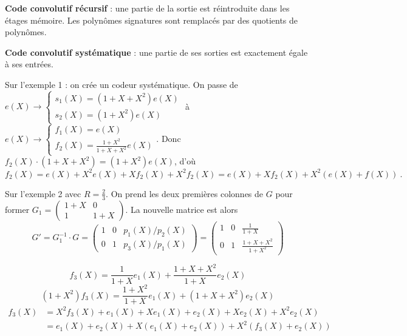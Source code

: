 	\begin{defn}
		\textbf{Code convolutif récursif} : une partie de la sortie est réintroduite dans les étages mémoire.
		Les polynômes signatures sont remplacés par des quotients de polynômes.
	\end{defn}
	
	\begin{defn}
		\textbf{Code convolutif systématique} : une partie de ses sorties est exactement égale à ses entrées.
	\end{defn}

	\begin{ex}
		Sur l'exemple 1 : on crée un codeur systématique.
		On passe de $e(X) \to \left\{ \begin{array}{l}
			s_1(X) = (1 + X + X^2) e(X) \\
			s_2(X) = (1 + X^2) e(X)
			\end{array} \right.$
		à $e(X) \to \left\{ \begin{array}{l}
			f_1(X) = e(X) \\
			f_2(X) = \frac{1 + X^2}{1 + X + X^2} e(X)
			\end{array} \right.$.
		Donc $f_2(X) \cdot (1 + X + X^2) = (1 + X^2) e(X)$, d'où
		$$f_2(X) = e(X) + X^2 e(X) + X f_2(X) + X^2 f_2(X) = e(X) + X f_2(X) + X^2 (e(X) + f(X))\ .$$
		
	\end{ex}
	
	\begin{ex}
		Sur l'exemple 2 avec $R = \frac{2}{3}$.
		On prend les deux premières colonnes de $G$ pour former $G_1 = \begin{pmatrix} 1 + X & 0 \\ 1 & 1 + X \end{pmatrix}$.
		La nouvelle matrice est alors
		$$G' = G_1^{-1} \cdot G
			= \begin{pmatrix} 1 & 0 & p_1(X)/p_2(X) \\ 0 & 1 & p_3(X)/p_1(X) \end{pmatrix}
			= \begin{pmatrix} 1 & 0 & \frac{1}{1 + X} \\ 0 & 1 & \frac{1 + X + X^2}{1 + X^2} \end{pmatrix}$$
		
		
		$$f_3(X) = \frac{1}{1 + X} e_1(X) + \frac{1 + X + X^2}{1 + X} e_2(X)$$
		$$(1 + X^2) f_3(X) = \frac{1 + X^2}{1 + X} e_1(X) + (1 + X + X^2) e_2(X)$$
		\begin{align*}
		f_3(X)
			& = X^2 f_3(X) + e_1(X) + X e_1(X) + e_2(X) + X e_2(X) + X^2 e_2(X) \\
			& = e_1(X) + e_2(X) + X(e_1(X) + e_2(X)) + X^2 (f_3(X) + e_2(X))
		\end{align*}
	\end{ex}


